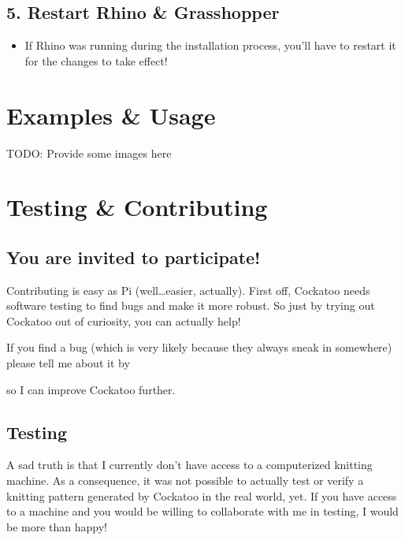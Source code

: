 \documentclass[letterpaper,10pt,english]{sphinxmanual}
\begin{document}
\subsection{5. Restart Rhino \& Grasshopper}
\label{\detokenize{README:restart-rhino-grasshopper}}\label{\detokenize{README:id6}}\begin{itemize}
\item {} 
If Rhino was running during the installation process, you’ll have to
restart it for the changes to take effect!

\end{itemize}


\section{Examples \& Usage}
\label{\detokenize{README:examples-usage}}\label{\detokenize{README:id7}}
TODO: Provide some images here


\section{Testing \& Contributing}
\label{\detokenize{README:testing-contributing}}\label{\detokenize{README:id8}}

\subsection{You are invited to participate!}
\label{\detokenize{README:you-are-invited-to-participate}}\label{\detokenize{README:id9}}
Contributing is easy as Pi (well…easier, actually). First off,
Cockatoo needs software testing to find bugs and make it more robust. So
just by trying out Cockatoo out of curiosity, you can actually help!

If you find a bug (which is very likely because they always sneak in
somewhere) please tell me about it by %
\begin{footnote}[33]\sphinxAtStartFootnote
{}
%
\end{footnote} so I can improve
Cockatoo further.


\subsection{Testing}
\label{\detokenize{README:testing}}
A sad truth is that I currently don’t have access to a computerized
knitting machine. As a consequence, it was not possible to actually test
or verify a knitting pattern generated by Cockatoo in the real world,
yet. If you have access to a machine and you would be willing to
collaborate with me in testing, I would be more than happy!
\end{document}
